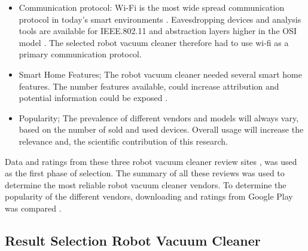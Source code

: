 \begin{itemize}
    \item Communication protocol: Wi-Fi is the most wide spread communication protocol in today's smart environments \cite{robotsel1}. Eavesdropping devices and analysis tools are available for IEEE.802.11 and abstraction layers higher in the OSI model \cite{osimodel}. The selected robot vacuum cleaner therefore had to use wi-fi as a primary communication protocol.
    
    \item Smart Home Features; The robot vacuum cleaner needed several smart home features. The number features available, could increase attribution and potential information could be exposed \cite{robotsel4}.
    
    \item Popularity; The prevalence of different vendors and models will always vary, based on the number of sold and used devices. Overall usage will increase the relevance and, the scientific contribution of this research.  
\end{itemize}

Data and ratings from these three robot vacuum cleaner review sites \cite{robotsel11}\cite{robotsel12}\cite{robotsel13}, was used  as the first phase of selection. The summary of all these reviews was used to determine the most reliable robot vacuum cleaner vendors. To determine the popularity of the different vendors, downloading and ratings from Google Play was compared \cite{GooglePlay}.

\subsection{Result Selection Robot Vacuum Cleaner}

